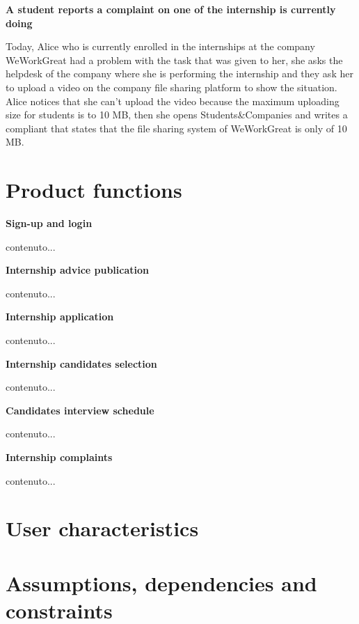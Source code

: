 			\textbf{A student reports a complaint on one of the internship is currently doing}
			\begin{flushleft}
				Today, Alice who is currently enrolled in the internships at the company WeWorkGreat had a problem with the task that was given to her, she asks the helpdesk of the company where she is performing the internship and they ask her to upload a video on the company file sharing platform to show the situation. Alice notices that she can’t upload the video because the maximum uploading size for students is to 10 MB, then she opens Students\&Companies and writes a compliant that states that the file sharing system of WeWorkGreat is only of 10 MB.
			\end{flushleft}
	\section{Product functions}
		\textbf{Sign-up and login}
			\begin{flushleft}
				contenuto...
			\end{flushleft}
		\textbf{Internship advice publication}
			\begin{flushleft}
				contenuto...
			\end{flushleft}
		\textbf{Internship application}
			\begin{flushleft}
				contenuto...
			\end{flushleft}
		\textbf{Internship candidates selection}
			\begin{flushleft}
				contenuto...
			\end{flushleft}
		\textbf{Candidates interview schedule}
			\begin{flushleft}
				contenuto...
			\end{flushleft}
		\textbf{Internship complaints}
			\begin{flushleft}
				contenuto...
			\end{flushleft}
	\section{User characteristics}
	\section{Assumptions, dependencies and constraints}